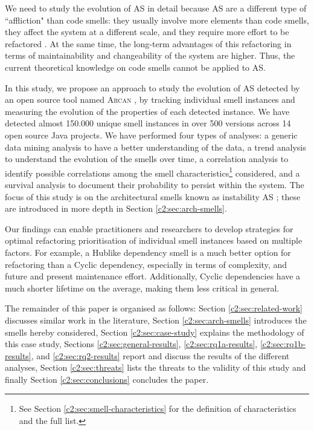 We need to study the evolution of AS in detail because AS are a different type of ``affliction" than code smells: they usually involve more elements than code smells, they affect the system at a different scale, and they require more effort to be refactored \cite{Lippert2006}. At the same time,  the long-term advantages of this refactoring in terms of maintainability and changeability of the system are higher. Thus, the current theoretical knowledge on code smells cannot be applied to AS.

In this study, we propose an approach to study the evolution of AS detected by an open source tool named \textsc{Arcan} \cite{Arcelli2017}, by tracking individual smell instances and measuring the evolution of the properties of each detected instance. We have detected almost 150.000 unique smell instances in over 500 versions across 14 open source Java projects.
We have performed four types of analyses: a generic data mining analysis to have a better understanding of the data, a trend analysis to understand the evolution of the smells over time, a correlation analysis to identify possible correlations among the smell characteristics\footnote{See Section \ref{c2:sec:smell-characteristics} for the definition of characteristics and the full list.} considered, and a survival analysis to document their probability to persist within the system.
The focus of this study is on the architectural smells known as instability AS \cite{Arcelli2016}; these are introduced in more depth in Section \ref{c2:sec:arch-smells}.

Our findings can enable practitioners and researchers to develop strategies for optimal refactoring prioritisation of individual smell instances based on multiple factors.
For example, a Hublike dependency smell is a much better option for refactoring than a Cyclic dependency, especially in terms of complexity, and future and present maintenance effort.
Additionally, Cyclic dependencies have a much shorter lifetime on the average, making them less critical in general.

The remainder of this paper is organised as follows: Section \ref{c2:sec:related-work} discusses similar work in the literature, Section \ref{c2:sec:arch-smells} introduces the smells hereby considered, Section \ref{c2:sec:case-study} explains the methodology of this case study, Sections \ref{c2:sec:general-results}, \ref{c2:sec:rq1a-results}, \ref{c2:sec:rq1b-results}, and \ref{c2:sec:rq2-results} report and discuss the results of the different analyses, Section \ref{c2:sec:threats} lists the threats to the validity of this study and finally Section \ref{c2:sec:conclusions} concludes the paper.

